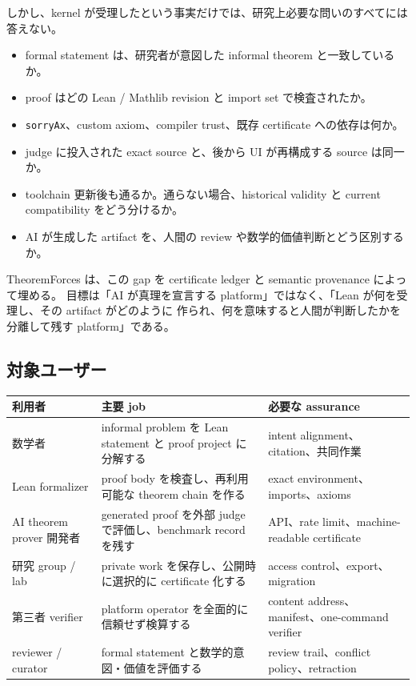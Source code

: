\documentclass[a4paper,11pt]{ltjsarticle}
\begin{document}
しかし、kernel が受理したという事実だけでは、研究上必要な問いのすべてには答えない。

\begin{itemize}
  \item formal statement は、研究者が意図した informal theorem と一致しているか。
  \item proof はどの Lean / Mathlib revision と import set で検査されたか。
  \item \texttt{sorryAx}、custom axiom、compiler trust、既存 certificate への依存は何か。
  \item judge に投入された exact source と、後から UI が再構成する source は同一か。
  \item toolchain 更新後も通るか。通らない場合、historical validity と current compatibility をどう分けるか。
  \item AI が生成した artifact を、人間の review や数学的価値判断とどう区別するか。
\end{itemize}

TheoremForces は、この gap を certificate ledger と semantic provenance によって埋める。
目標は「AI が真理を宣言する platform」ではなく、「Lean が何を受理し、その artifact がどのように
作られ、何を意味すると人間が判断したかを分離して残す platform」である\cite{tfhome,tfsemantic}。

\subsection{対象ユーザー}

\begin{tabularx}{\linewidth}{L{34mm}YY}
\toprule
\textbf{利用者} & \textbf{主要 job} & \textbf{必要な assurance} \\
\midrule
数学者 & informal problem を Lean statement と proof project に分解する & intent alignment、citation、共同作業 \\
Lean formalizer & proof body を検査し、再利用可能な theorem chain を作る & exact environment、imports、axioms \\
AI theorem prover 開発者 & generated proof を外部 judge で評価し、benchmark record を残す & API、rate limit、machine-readable certificate \\
研究 group / lab & private work を保存し、公開時に選択的に certificate 化する & access control、export、migration \\
第三者 verifier & platform operator を全面的に信頼せず検算する & content address、manifest、one-command verifier \\
reviewer / curator & formal statement と数学的意図・価値を評価する & review trail、conflict policy、retraction \\
\bottomrule
\end{tabularx}
\end{document}
